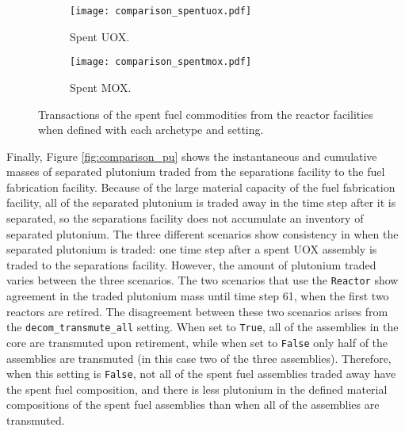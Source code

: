 \begin{figure}[ht!]
    \centering
    \begin{subfigure}[b]{0.48\textwidth}
        \centering
        \texttt{[image: comparison\_spentuox.pdf]}
        \caption{Spent UOX.}
        \label{fig:comparison_spentuox}
    \end{subfigure}
    \hfill
    \begin{subfigure}[b]{0.48\textwidth}
        \centering
        \texttt{[image: comparison\_spentmox.pdf]}
        \caption{Spent MOX.}
        \label{fig:comparison_spentmox}
    \end{subfigure}
       \caption{Transactions of the spent fuel commodities from the 
       reactor facilities when defined with each archetype and 
       setting.}
       \label{fig:comparison_spentfuel}
\end{figure}

Finally, Figure \ref{fig:comparison_pu} shows the instantaneous and cumulative 
masses of separated plutonium traded from the separations facility to 
the fuel fabrication facility. Because of the large material capacity of 
the fuel fabrication facility, all of the separated plutonium is traded 
away in the time step after it is separated, so the separations facility does 
not accumulate an inventory of separated plutonium. The three different 
scenarios show consistency
in when the separated plutonium is traded: one time step after a spent
\gls{UOX} assembly is traded to the separations facility. However, the 
amount of plutonium traded varies between the three scenarios. The two 
scenarios that use the \Cycamore \texttt{Reactor} show agreement in the 
traded plutonium mass until time step 61, when the first two reactors are
retired. The disagreement between these two scenarios arises from the 
\texttt{decom\_transmute\_all} setting. When set to \texttt{True}, 
all of the assemblies in the core are transmuted upon retirement, 
while when set to \texttt{False} only half of the assemblies are 
transmuted (in this case two of the three assemblies). Therefore, 
when this setting is \texttt{False}, not all of the 
spent fuel assemblies traded away have the spent fuel composition, and 
there is less plutonium in the defined material compositions 
of the spent fuel assemblies than when all of the assemblies are transmuted. 

